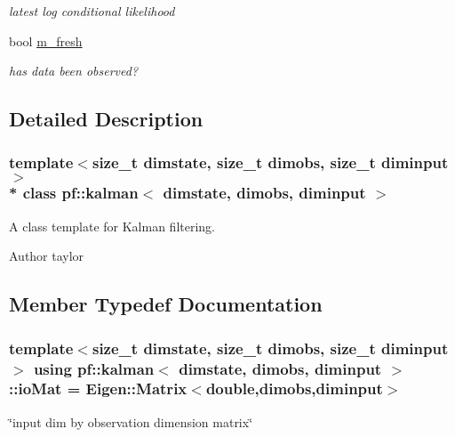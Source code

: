 \begin{DoxyCompactItemize}
\begin{DoxyCompactList}\small\item\em latest log conditional likelihood \end{DoxyCompactList}\item 
bool \hyperlink{classpf_1_1kalman_a0eee8bb578016b1e9600ffd2c9f23aa9}{m\+\_\+fresh}\hypertarget{classpf_1_1kalman_a0eee8bb578016b1e9600ffd2c9f23aa9}{}\label{classpf_1_1kalman_a0eee8bb578016b1e9600ffd2c9f23aa9}

\begin{DoxyCompactList}\small\item\em has data been observed? \end{DoxyCompactList}\end{DoxyCompactItemize}


\subsection{Detailed Description}
\subsubsection*{template$<$size\+\_\+t dimstate, size\+\_\+t dimobs, size\+\_\+t diminput$>$\\*
class pf\+::kalman$<$ dimstate, dimobs, diminput $>$}

A class template for Kalman filtering. 

\begin{DoxyAuthor}{Author}
taylor 
\end{DoxyAuthor}


\subsection{Member Typedef Documentation}
\subsubsection[{\texorpdfstring{io\+Mat}{ioMat}}]{\setlength{\rightskip}{0pt plus 5cm}template$<$size\+\_\+t dimstate, size\+\_\+t dimobs, size\+\_\+t diminput$>$ using {\bf pf\+::kalman}$<$ dimstate, dimobs, diminput $>$\+::{\bf io\+Mat} =  Eigen\+::\+Matrix$<$double,dimobs,diminput$>$\hspace{0.3cm}{\ttfamily [private]}}\hypertarget{classpf_1_1kalman_a1bef1b09ec25689b765bb57bf1bbbfd6}{}\label{classpf_1_1kalman_a1bef1b09ec25689b765bb57bf1bbbfd6}
\char`\"{}input dim by observation dimension matrix\char`\"{} 
